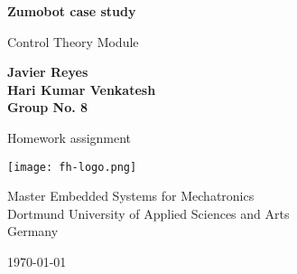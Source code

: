 \begin{titlepage}
  \begin{center}
    \vspace*{1cm}

    \Huge
    \textbf{Zumobot case study}

    \vspace{0.5cm}

    \LARGE
    {Control Theory Module}

    \vspace{3.5cm}

    \textbf{Javier Reyes\\
            Hari Kumar Venkatesh\\
						Group No. 8}

    \vfill

    {Homework assignment}

    \vspace{2cm}

    \texttt{[image: fh-logo.png]}

    \vspace{1cm}

    \Large
    {Master Embedded Systems for Mechatronics\\
    Dortmund University of Applied Sciences and Arts\\
    Germany}

    \vspace{0.5cm}

    \large
    {\today}

  \end{center}
\end{titlepage}
